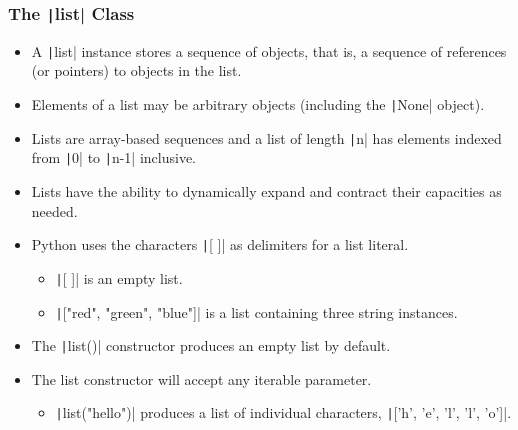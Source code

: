 \begin{frame}
    \frametitle{The \texttt|list| Class}

    \begin{itemize}
        \item A \texttt|list| instance stores a sequence of objects, that is, a sequence of references (or pointers) to objects in the list.
        \item Elements of a list may be arbitrary objects (including the \texttt|None| object).
        \item Lists are array-based sequences and a list of length \texttt|n| has elements indexed from \texttt|0| to \texttt|n-1| inclusive.
        \item Lists have the ability to dynamically expand and contract their capacities as needed.
        \item Python uses the characters \texttt|[ ]| as delimiters for a list literal.
              \begin{itemize}
                  \item \texttt|[ ]| is an empty list.
                  \item \texttt|["red", "green", "blue"]| is a list containing three string instances.
              \end{itemize}
        \item The \texttt|list()| constructor produces an empty list by default.
        \item The list constructor will accept any iterable parameter.
              \begin{itemize}
                  \item \texttt|list("hello")| produces a list of individual characters, \texttt|['h', 'e', 'l', 'l', 'o']|.
              \end{itemize}

    \end{itemize}

\end{frame}

